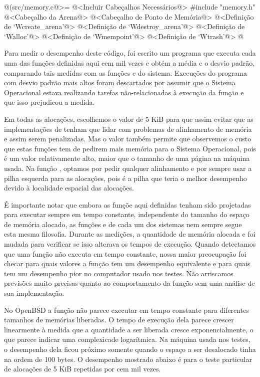 \iniciocodigo
@(src/memory.c@>=
@<Incluir Cabeçalhos Necessários@>
#include "memory.h"
@<Cabeçalho da Arena@>
@<Cabeçalho de Ponto de Memória@>
@<Definição de `Wcreate\_arena'@>
@<Definição de `Wdestroy\_arena'@>
@<Definição de `Walloc'@>
@<Definição de `Wmempoint'@>
@<Definição de `Wtrash'@>
@
\fimcodigo


Para medir o desempenho deste código, foi escrito um programa que
executa cada uma das funções definidas aqui cem mil vezes e obtém
a média e o desvio padrão, comparando tais medidas com as
funções  e  do sistema. Execuções
do programa com desvio padrão mais altos foram descartados por assumir
que o Sistema Operacional estava realizando tarefas não-relacionadas à
execução da função e que isso prejudicou a medida.

Em todas as alocações, escolhemos o valor de 5 KiB para que assim
evitar que as implementações de  tenham que lidar
com problemas de alinhamento de memória e assim serem penalizadas. Mas
o valor também permite que observemos o custo que estas funções tem de
pedirem mais memória para o Sistema Operacional, pois é um valor
relativamente alto, maior que o tamanho de uma página na máquina
usada. Na função , optamos por pedir qualquer
alinhamento e por sempre usar a pilha esquerda para as alocações, pois
é a pilha que teria o melhor desempenho devido à localidade espacial
das alocações.

É importante notar que embora as funçõe aqui definidas tenham sido
projetadas para executar sempre em tempo constante, independente do
tamanho do espaço de memória alocado, as funções 
e  de cada um dos sistemas nem sempre segue esta
mesma filosofia. Durante as medições, a quantidade de memória alocada
e foi mudada para verificar se isso alterava os tempos de
execução. Quando detectamos que uma função não executa em tempo
constante, nossa maior preocupação foi checar para quais valores a
função tem um desempenho equivalente e para quais tem um desempenho
pior no computador usado nos testes. Não arriscamos previsões muito
precisas quanto ao comportamento da função sem uma análise de sua
implementação.


No OpenBSD a função  não parece executar em tempo
constante para diferentes tamanhos de memórias liberadas. O tempo de
execução dela parece crescer linearmente à medida que a quantidade a
ser liberada cresce exponencialmente, o que parece indicar uma
complexicade logarítmica. Na máquina usada nos testes, o desempenho
dela ficou próximo somente quando o espaço a ser desalocado tinha na
ordem de 100 bytes. O desempenho mostrado abaixo é para o teste
particular de alocações de 5 KiB repetidas por cem mil vezes.

